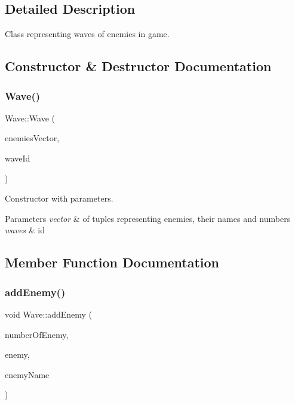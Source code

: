 \subsection{Detailed Description}
Class representing waves of enemies in game. 

\subsection{Constructor \& Destructor Documentation}
\mbox{\label{class_wave_afbe28f8ee2238a9ead6aec5da1969618}} 
\subsubsection{\texorpdfstring{Wave()}{Wave()}}
{\footnotesize\ttfamily Wave\+::\+Wave (\begin{DoxyParamCaption}\item[{std\+::vector$<$ std\+::tuple$<$ int, \mbox{\hyperlink{class_enemy_designer}{Enemy\+Designer}} $\ast$, std\+::string $>$$>$}]{enemies\+Vector,  }\item[{int}]{wave\+Id }\end{DoxyParamCaption})}



Constructor with parameters. 


\begin{DoxyParams}{Parameters}
{\em vector} & of tuples representing enemies, their names and numbers \\
\hline
{\em wave\textquotesingle{}s} & id \\
\hline
\end{DoxyParams}


\subsection{Member Function Documentation}
\mbox{\label{class_wave_a751c1e868a8b9c3d3f41063cdd474eb4}} 
\subsubsection{\texorpdfstring{add\+Enemy()}{addEnemy()}}
{\footnotesize\ttfamily void Wave\+::add\+Enemy (\begin{DoxyParamCaption}\item[{int}]{number\+Of\+Enemy,  }\item[{\mbox{\hyperlink{class_enemy_designer}{Enemy\+Designer}} $\ast$}]{enemy,  }\item[{std\+::string}]{enemy\+Name }\end{DoxyParamCaption})}



